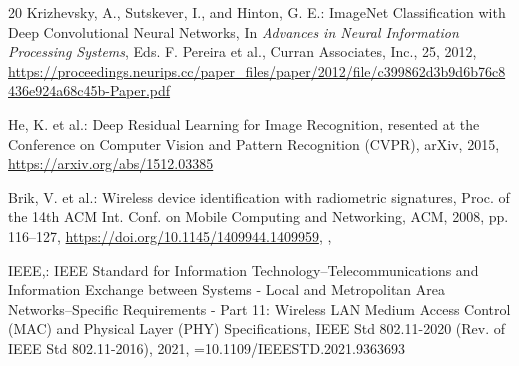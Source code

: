 \begin{thebibliography}{20}
Krizhevsky, A., Sutskever, I., and Hinton, G. E.: ImageNet Classification with Deep Convolutional Neural Networks, In \textit{Advances in Neural Information Processing Systems}, Eds. F. Pereira et al., Curran Associates, Inc., 25, 2012, \url{https://proceedings.neurips.cc/paper_files/paper/2012/file/c399862d3b9d6b76c8436e924a68c45b-Paper.pdf}

He, K. et al.: Deep Residual Learning for Image Recognition, resented at the Conference on Computer Vision and Pattern Recognition (CVPR), arXiv, 2015, \url{https://arxiv.org/abs/1512.03385}

Brik, V. et al.: Wireless device identification with radiometric signatures, Proc. of the 14th ACM Int. Conf. on Mobile Computing and Networking, ACM, 2008, pp. 116–127, \url{https://doi.org/10.1145/1409944.1409959}, ,


IEEE,: IEEE Standard for Information Technology--Telecommunications and Information Exchange between Systems - Local and Metropolitan Area Networks--Specific Requirements - Part 11: Wireless LAN Medium Access Control (MAC) and Physical Layer (PHY) Specifications, IEEE Std 802.11-2020 (Rev. of IEEE Std 802.11-2016), 2021, \doi={10.1109/IEEESTD.2021.9363693}

\end{thebibliography}